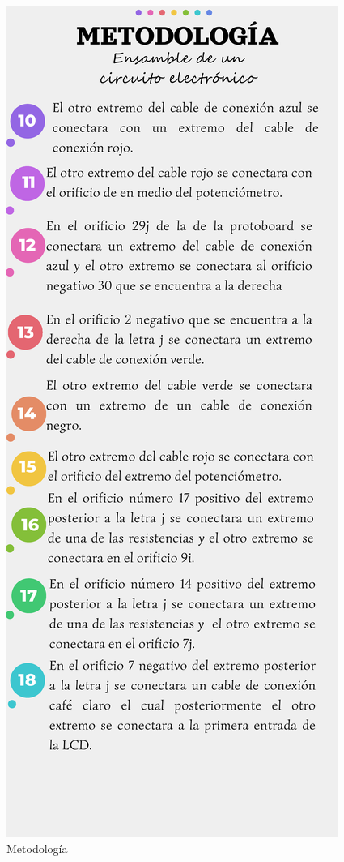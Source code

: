     \begin{figure}[H]
        \centering
        \includegraphics[trim = {5mm 10mm 5mm 50mm},clip,scale=0.4]{16/Img/Instructivo C.E (2).pdf}
        \caption{Metodología}
        \label{fig:metodología}
    \end{figure}
